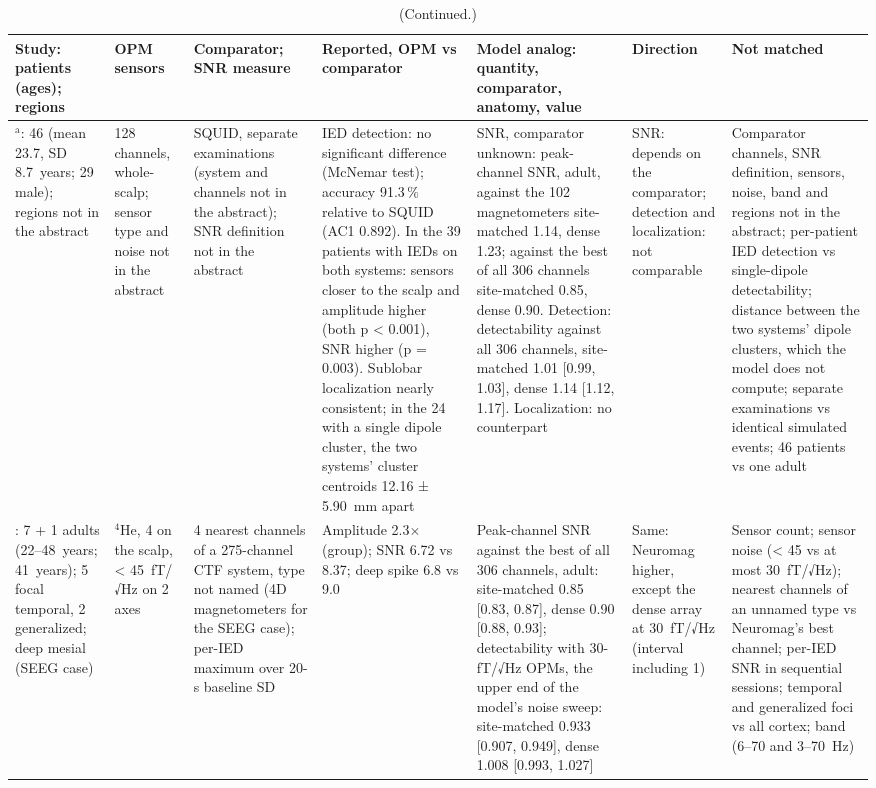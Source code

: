 \documentclass[preprint,12pt,authoryear,a4paper]{elsarticle}
\begin{document}
\begin{table}
\ContinuedFloat
\caption[]{(Continued.)}
\scriptsize
\setlength{\tabcolsep}{3pt}
\begin{tabular}{L{2.7cm}L{2.1cm}L{2.9cm}L{3.3cm}L{5.7cm}L{2.2cm}L{4.1cm}}
\toprule
Study: patients (ages); regions & OPM sensors & Comparator; SNR measure & Reported, OPM vs comparator & Model analog: quantity, comparator, anatomy, value & Direction & Not matched \\
\midrule
\citet{ren2025}$^{\mathrm{a}}$: 46 (mean 23.7, SD 8.7~years; 29 male); regions not in the abstract & 128 channels, whole-scalp; sensor type and noise not in the abstract & SQUID, separate examinations (system and channels not in the abstract); SNR definition not in the abstract & IED detection: no significant difference (McNemar test); accuracy 91.3\,\% relative to SQUID (AC1 0.892). In the 39 patients with IEDs on both systems: sensors closer to the scalp and amplitude higher (both p < 0.001), SNR higher (p = 0.003). Sublobar localization nearly consistent; in the 24 with a single dipole cluster, the two systems' cluster centroids 12.16 ± 5.90~mm apart & SNR, comparator unknown: peak-channel SNR, adult, against the 102 magnetometers site-matched 1.14, dense 1.23; against the best of all 306 channels site-matched 0.85, dense 0.90. Detection: detectability against all 306 channels, site-matched 1.01 [0.99, 1.03], dense 1.14 [1.12, 1.17]. Localization: no counterpart & SNR: depends on the comparator; detection and localization: not comparable & Comparator channels, SNR definition, sensors, noise, band and regions not in the abstract; per-patient IED detection vs single-dipole detectability; distance between the two systems' dipole clusters, which the model does not compute; separate examinations vs identical simulated events; 46 patients vs one adult \\
\citet{schwartz2025}: 7 + 1 adults (22--48~years; 41~years); 5 focal temporal, 2 generalized; deep mesial (SEEG case) & $^{4}$He, 4 on the scalp, < 45~fT/√Hz on 2 axes & 4 nearest channels of a 275-channel CTF system, type not named (4D magnetometers for the SEEG case); per-IED maximum over 20-s baseline SD & Amplitude 2.3× (group); SNR 6.72 vs 8.37; deep spike 6.8 vs 9.0 & Peak-channel SNR against the best of all 306 channels, adult: site-matched 0.85 [0.83, 0.87], dense 0.90 [0.88, 0.93]; detectability with 30-fT/√Hz OPMs, the upper end of the model's noise sweep: site-matched 0.933 [0.907, 0.949], dense 1.008 [0.993, 1.027] & Same: Neuromag higher, except the dense array at 30~fT/√Hz (interval including 1) & Sensor count; sensor noise (< 45 vs at most 30~fT/√Hz); nearest channels of an unnamed type vs Neuromag's best channel; per-IED SNR in sequential sessions; temporal and generalized foci vs all cortex; band (6--70 and 3--70~Hz) \\

\end{tabular}
\end{table}
\end{document}
